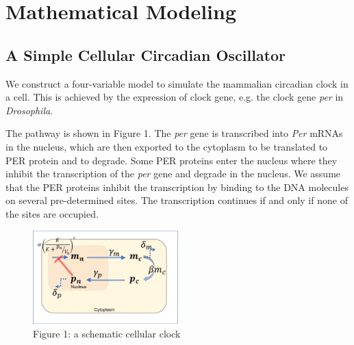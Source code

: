 \documentclass[12pt]{article}
\renewcommand{\(}{\left (}
\renewcommand{\)}{\right )}
\begin{document}
\section{Mathematical Modeling}
\subsection{A Simple Cellular Circadian Oscillator}
\hspace{5mm} We construct a four-variable model to simulate the mammalian circadian clock in a cell. This is achieved by the expression of clock gene, e.g. the clock gene \textit{per} in \textit{Drosophila}.

The pathway is shown in Figure 1. The \textit{per} gene is transcribed into \textit{Per} mRNAs in the nucleus, which are then exported to the cytoplasm to be translated to PER protein and to degrade. Some PER proteins enter the nucleus where they inhibit the transcription of the \textit{per} gene and degrade in the nucleus. We assume that the PER proteins inhibit the transcription by binding to the DNA molecules on several pre-determined sites. The transcription continues if and only if none of the sites are occupied.


\begin {figure}[t]
	\centering
	\includegraphics[width=0.5\textwidth]{pathway.png}
	\caption*{\small Figure 1: a schematic cellular clock}
\end {figure}
\end{document}
